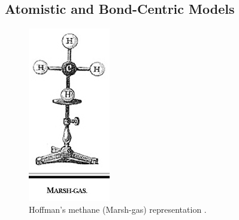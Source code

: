 \subsection{Atomistic and Bond-Centric Models}
\begin{figure} 
\vspace{-27pt}
  \begin{center}
  \includegraphics[width=0.9\linewidth]{pictures/04_hoffman.jpg} 
  \caption{Hoffman's methane (Marsh-gas) representation \cite{perkins2005history}.}
  \label{Fig:hoffman}  
\end{center}
  \vspace{-15pt}
\end{figure}

